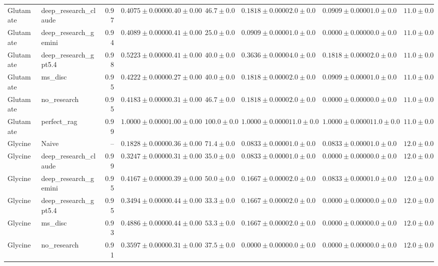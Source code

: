 \begin{table}[htbp]
\begin{tabular}{llrrrrrrrrr}
Glutamate & deep_research_claude & 0.97 & $0.4075 \pm 0.0000$ & $0.40 \pm 0.00$ & $46.7 \pm 0.0$ & $0.1818 \pm 0.0000$ & $2.0 \pm 0.0$ & $0.0909 \pm 0.0000$ & $1.0 \pm 0.0$ & $11.0 \pm 0.0$ \\
Glutamate & deep_research_gemini & 0.94 & $0.4089 \pm 0.0000$ & $0.41 \pm 0.00$ & $25.0 \pm 0.0$ & $0.0909 \pm 0.0000$ & $1.0 \pm 0.0$ & $0.0000 \pm 0.0000$ & $0.0 \pm 0.0$ & $11.0 \pm 0.0$ \\
Glutamate & deep_research_gpt5.4 & 0.98 & $0.5223 \pm 0.0000$ & $0.41 \pm 0.00$ & $40.0 \pm 0.0$ & $0.3636 \pm 0.0000$ & $4.0 \pm 0.0$ & $0.1818 \pm 0.0000$ & $2.0 \pm 0.0$ & $11.0 \pm 0.0$ \\
Glutamate & ms_disc & 0.95 & $0.4222 \pm 0.0000$ & $0.27 \pm 0.00$ & $40.0 \pm 0.0$ & $0.1818 \pm 0.0000$ & $2.0 \pm 0.0$ & $0.0909 \pm 0.0000$ & $1.0 \pm 0.0$ & $11.0 \pm 0.0$ \\
Glutamate & no_research & 0.95 & $0.4183 \pm 0.0000$ & $0.31 \pm 0.00$ & $46.7 \pm 0.0$ & $0.1818 \pm 0.0000$ & $2.0 \pm 0.0$ & $0.0000 \pm 0.0000$ & $0.0 \pm 0.0$ & $11.0 \pm 0.0$ \\
Glutamate & perfect_rag & 0.99 & \cellcolor{green!25}$1.0000 \pm 0.0000$ & $1.00 \pm 0.00$ & $100.0 \pm 0.0$ & $1.0000 \pm 0.0000$ & $11.0 \pm 0.0$ & $1.0000 \pm 0.0000$ & $11.0 \pm 0.0$ & $11.0 \pm 0.0$ \\
\midrule
Glycine & Naive & -- & \cellcolor{red!25}$0.1828 \pm 0.0000$ & $0.36 \pm 0.00$ & $71.4 \pm 0.0$ & $0.0833 \pm 0.0000$ & $1.0 \pm 0.0$ & $0.0833 \pm 0.0000$ & $1.0 \pm 0.0$ & $12.0 \pm 0.0$ \\
Glycine & deep_research_claude & 0.99 & $0.3247 \pm 0.0000$ & $0.31 \pm 0.00$ & $35.0 \pm 0.0$ & $0.0833 \pm 0.0000$ & $1.0 \pm 0.0$ & $0.0000 \pm 0.0000$ & $0.0 \pm 0.0$ & $12.0 \pm 0.0$ \\
Glycine & deep_research_gemini & 0.95 & $0.4167 \pm 0.0000$ & $0.39 \pm 0.00$ & $50.0 \pm 0.0$ & $0.1667 \pm 0.0000$ & $2.0 \pm 0.0$ & $0.0833 \pm 0.0000$ & $1.0 \pm 0.0$ & $12.0 \pm 0.0$ \\
Glycine & deep_research_gpt5.4 & 0.95 & $0.3494 \pm 0.0000$ & $0.44 \pm 0.00$ & $33.3 \pm 0.0$ & $0.1667 \pm 0.0000$ & $2.0 \pm 0.0$ & $0.0000 \pm 0.0000$ & $0.0 \pm 0.0$ & $12.0 \pm 0.0$ \\
Glycine & ms_disc & 0.93 & $0.4886 \pm 0.0000$ & $0.44 \pm 0.00$ & $53.3 \pm 0.0$ & $0.1667 \pm 0.0000$ & $2.0 \pm 0.0$ & $0.0000 \pm 0.0000$ & $0.0 \pm 0.0$ & $12.0 \pm 0.0$ \\
Glycine & no_research & 0.91 & $0.3597 \pm 0.0000$ & $0.31 \pm 0.00$ & $37.5 \pm 0.0$ & $0.0000 \pm 0.0000$ & $0.0 \pm 0.0$ & $0.0000 \pm 0.0000$ & $0.0 \pm 0.0$ & $12.0 \pm 0.0$ \\

\end{tabular}
\end{table}
